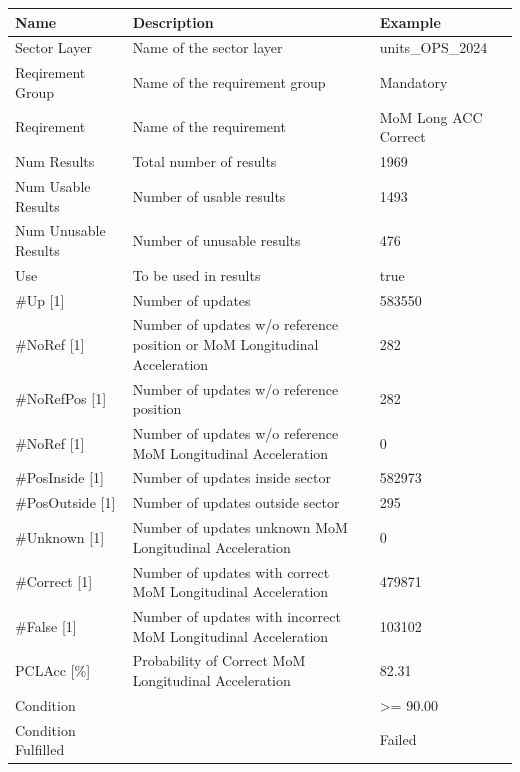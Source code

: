 \begin{center}
 \begin{table}[H]
  \begin{tabularx}{\textwidth}{ | l | X |  l | }
    \hline
    \textbf{Name} & \textbf{Description} & \textbf{Example} \\ \hline
    Sector Layer & Name of the sector layer & units\_OPS\_2024 \\ \hline
    Reqirement Group & Name of the requirement group & Mandatory \\ \hline
    Reqirement & Name of the requirement & MoM Long ACC Correct \\ \hline
    Num Results & Total number of results & 1969 \\ \hline
    Num Usable Results & Number of usable results & 1493 \\ \hline
    Num Unusable Results & Number of unusable results & 476 \\ \hline
    Use & To be used in results & true \\ \hline
    \#Up [1] & Number of updates & 583550 \\ \hline
    \#NoRef [1] & Number of updates w/o reference position or MoM Longitudinal Acceleration & 282 \\ \hline
    \#NoRefPos [1] & Number of updates w/o reference position & 282 \\ \hline
    \#NoRef [1] & Number of updates w/o reference MoM Longitudinal Acceleration & 0 \\ \hline
    \#PosInside [1] & Number of updates inside sector & 582973 \\ \hline
    \#PosOutside [1] & Number of updates outside sector & 295 \\ \hline
    \#Unknown [1] & Number of updates unknown MoM Longitudinal Acceleration & 0 \\ \hline
    \#Correct [1] & Number of updates with correct MoM Longitudinal Acceleration & 479871 \\ \hline
    \#False [1] & Number of updates with incorrect MoM Longitudinal Acceleration & 103102 \\ \hline
    PCLAcc [\%] & Probability of Correct MoM Longitudinal Acceleration & 82.31 \\ \hline
    Condition &  & >= 90.00 \\ \hline
    Condition Fulfilled &  & Failed \\ \hline
    \end{tabularx}
\end{table}
\end{center}

